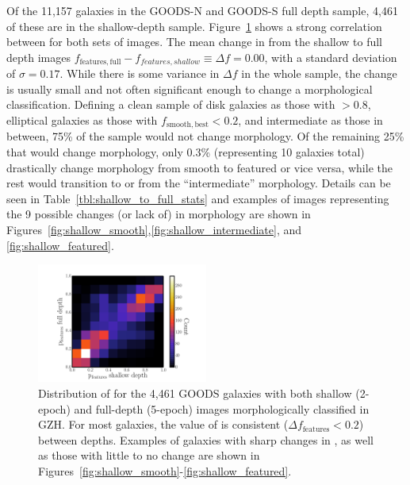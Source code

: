 \documentclass[twocolumn]{aastex6}
\begin{document}
Of the 11,157 galaxies in the GOODS-N and GOODS-S full depth sample, 4,461 of these are in the shallow-depth sample. Figure~\ref{fig:shallow_vs_full} shows a strong correlation between \ffeatures{} for both sets of images. The mean change in \ffeatures{} from the shallow to full depth images  $f_\mathrm{features,full} - f_{features,shallow} \equiv \Delta f = 0.00$, with a standard deviation of $\sigma = 0.17$. While there is some variance in $\Delta f$ in the whole sample, the change is usually small and not often significant enough to change a morphological classification. Defining a clean sample of disk galaxies as those with \fbest$>0.8$, elliptical galaxies as those with $f_\mathrm{smooth,best}<0.2$, and intermediate as those in between, 75\% of the sample would not change morphology. Of the remaining 25\% that would change morphology, only 0.3\% (representing 10 galaxies total) drastically change morphology from smooth to featured or vice versa, while the rest would transition to or from the ``intermediate'' morphology. Details can be seen in Table~\ref{tbl:shallow_to_full_stats} and examples of images representing the 9 possible changes (or lack of) in morphology are shown in Figures~\ref{fig:shallow_smooth},\ref{fig:shallow_intermediate}, and \ref{fig:shallow_featured}.

\begin{figure}
\begin{center}
\includegraphics[width=0.50\textwidth]{figures/full_shallow_p_plot.pdf}
\caption{Distribution of \ffeatures{} for the 4,461 GOODS galaxies with both shallow (2-epoch) and full-depth (5-epoch) images morphologically classified in GZH. For most galaxies, the value of \ffeatures{} is consistent ($\Delta f_\mathrm{features}<0.2$) between depths. Examples of galaxies with sharp changes in \ffeatures, as well as those with little to no change are shown in Figures~\ref{fig:shallow_smooth}-\ref{fig:shallow_featured}.}
\label{fig:shallow_vs_full}
\end{center}
\end{figure}
\end{document}
